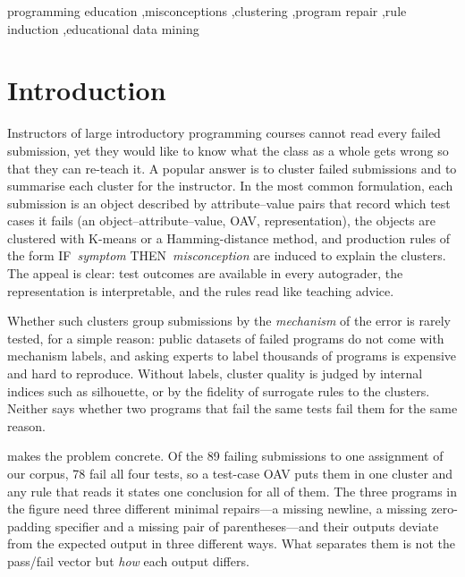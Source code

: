 \documentclass[a4paper,preprint,12pt,authoryear]{elsarticle}
\begin{document}
\begin{frontmatter}
\begin{abstract}
\end{abstract}

\begin{keyword}
programming education \sep misconceptions \sep clustering \sep program repair \sep rule induction \sep educational data mining
\end{keyword}

\end{frontmatter}

\section{Introduction}\label{sec:intro}

Instructors of large introductory programming courses cannot read every failed submission, yet they would like to know what the class as a whole gets wrong so that they can re-teach it. A popular answer is to cluster failed submissions and to summarise each cluster for the instructor. In the most common formulation, each submission is an object described by attribute--value pairs that record which test cases it fails (an object--attribute--value, OAV, representation), the objects are clustered with K-means or a Hamming-distance method, and production rules of the form IF~\emph{symptom} THEN~\emph{misconception} are induced to explain the clusters. The appeal is clear: test outcomes are available in every autograder, the representation is interpretable, and the rules read like teaching advice.

Whether such clusters group submissions by the \emph{mechanism} of the error is rarely tested, for a simple reason: public datasets of failed programs do not come with mechanism labels, and asking experts to label thousands of programs is expensive and hard to reproduce. Without labels, cluster quality is judged by internal indices such as silhouette, or by the fidelity of surrogate rules to the clusters. Neither says whether two programs that fail the same tests fail them for the same reason.

 makes the problem concrete. Of the 89 failing submissions to one assignment of our corpus, 78 fail all four tests, so a test-case OAV puts them in one cluster and any rule that reads it states one conclusion for all of them. The three programs in the figure need three different minimal repairs---a missing newline, a missing zero-padding specifier and a missing pair of parentheses---and their outputs deviate from the expected output in three different ways. What separates them is not the pass/fail vector but \emph{how} each output differs.
\end{document}
